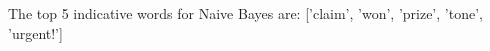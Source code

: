 \begin{answer}
The top 5 indicative words for Naive Bayes are:  ['claim',  'won', 'prize', 'tone', 'urgent!']
\end{answer}
